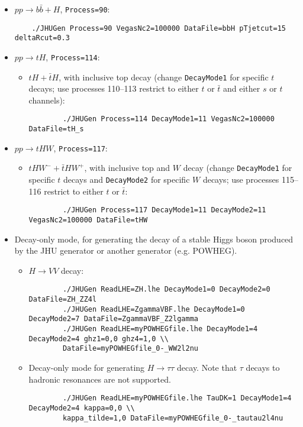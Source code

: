 \documentclass[aps,superscriptaddress,nofootinbib]{revtex4}
\begin{document}
\begin{itemize}
\begin{itemize}
\begin{verbatim}
		\end{verbatim}
	\end{itemize}
	\item $pp \to b\bar{b}+H$, \texttt{Process=90}:
	\begin{verbatim}
	./JHUGen Process=90 VegasNc2=100000 DataFile=bbH pTjetcut=15 deltaRcut=0.3
	\end{verbatim}
	\item $pp \to tH$, \texttt{Process=114}:
	\begin{itemize}
		\item $tH+\bar{t}H$, with inclusive top decay (change \verb|DecayMode1| for specific $t$ decays; use processes 110--113 restrict to either $t$ or $\bar{t}$ and either $s$ or $t$ channels):
		\begin{verbatim}
		./JHUGen Process=114 DecayMode1=11 VegasNc2=100000 DataFile=tH_s
		\end{verbatim}
	\end{itemize}
	\item $pp \to tHW$, \texttt{Process=117}:
	\begin{itemize}
		\item $tHW^-+\bar{t}HW^+$, with inclusive top and $W$ decay (change \verb|DecayMode1| for specific $t$ decays and \verb|DecayMode2| for specific $W$ decays; use processes 115--116 restrict to either $t$ or $\bar{t}$:
		\begin{verbatim}
		./JHUGen Process=117 DecayMode1=11 DecayMode2=11 VegasNc2=100000 DataFile=tHW
		\end{verbatim}
	\end{itemize}
	\item Decay-only mode, for generating the decay of a stable Higgs boson produced by the JHU generator or another generator (e.g. POWHEG).
	\begin{itemize}
		\item $H\to VV$ decay:
		\begin{verbatim}
		./JHUGen ReadLHE=ZH.lhe DecayMode1=0 DecayMode2=0 DataFile=ZH_ZZ4l
		./JHUGen ReadLHE=ZgammaVBF.lhe DecayMode1=0 DecayMode2=7 DataFile=ZgammaVBF_Z2lgamma
		./JHUGen ReadLHE=myPOWHEGfile.lhe DecayMode1=4 DecayMode2=4 ghz1=0,0 ghz4=1,0 \\
	    DataFile=myPOWHEGfile_0-_WW2l2nu
		\end{verbatim}
		\item Decay-only mode for generating $H\to\tau\tau$ decay.  Note that $\tau$ decays to hadronic resonances are not supported.
		\begin{verbatim}
		./JHUGen ReadLHE=myPOWHEGfile.lhe TauDK=1 DecayMode1=4 DecayMode2=4 kappa=0,0 \\
		kappa_tilde=1,0 DataFile=myPOWHEGfile_0-_tautau2l4nu
		\end{verbatim}
	\end{itemize}
\end{itemize}
\end{document}
